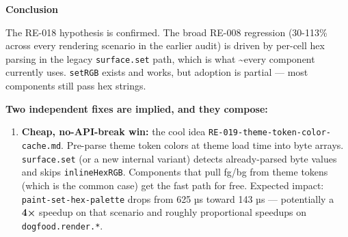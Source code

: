 \textbf{Conclusion}

The RE-018 hypothesis is confirmed. The broad RE-008 regression (30-113\% across every rendering scenario in the earlier audit) is driven by per-cell hex parsing in the legacy \texttt{s\allowbreak{}u\allowbreak{}r\allowbreak{}f\allowbreak{}a\allowbreak{}c\allowbreak{}e\allowbreak{}.\allowbreak{}s\allowbreak{}e\allowbreak{}t} path, which is what \textasciitilde every component currently uses. \texttt{s\allowbreak{}e\allowbreak{}t\allowbreak{}R\allowbreak{}G\allowbreak{}B} exists and works, but adoption is partial --- most components still pass hex strings.

\textbf{Two independent fixes are implied, and they compose:}

\begin{enumerate}
\def\labelenumi{\arabic{enumi}.}
\tightlist
\item
  \textbf{Cheap, no-API-break win:} the cool idea \texttt{R\allowbreak{}E\allowbreak{}-\allowbreak{}0\allowbreak{}1\allowbreak{}9\allowbreak{}-\allowbreak{}t\allowbreak{}h\allowbreak{}e\allowbreak{}m\allowbreak{}e\allowbreak{}-\allowbreak{}t\allowbreak{}o\allowbreak{}k\allowbreak{}e\allowbreak{}n\allowbreak{}-\allowbreak{}c\allowbreak{}o\allowbreak{}l\allowbreak{}o\allowbreak{}r\allowbreak{}-\allowbreak{}c\allowbreak{}a\allowbreak{}c\allowbreak{}h\allowbreak{}e\allowbreak{}.\allowbreak{}m\allowbreak{}d}. Pre-parse theme token colors at theme load time into byte arrays. \texttt{s\allowbreak{}u\allowbreak{}r\allowbreak{}f\allowbreak{}a\allowbreak{}c\allowbreak{}e\allowbreak{}.\allowbreak{}s\allowbreak{}e\allowbreak{}t} (or a new internal variant) detects already-parsed byte values and skips \texttt{i\allowbreak{}n\allowbreak{}l\allowbreak{}i\allowbreak{}n\allowbreak{}e\allowbreak{}H\allowbreak{}e\allowbreak{}x\allowbreak{}R\allowbreak{}G\allowbreak{}B}. Components that pull fg/bg from theme tokens (which is the common case) get the fast path for free. Expected impact: \texttt{p\allowbreak{}a\allowbreak{}i\allowbreak{}n\allowbreak{}t\allowbreak{}-\allowbreak{}s\allowbreak{}e\allowbreak{}t\allowbreak{}-\allowbreak{}h\allowbreak{}e\allowbreak{}x\allowbreak{}-\allowbreak{}p\allowbreak{}a\allowbreak{}l\allowbreak{}e\allowbreak{}t\allowbreak{}t\allowbreak{}e} drops from 625 µs toward 143 µs --- potentially a \textbf{4×} speedup on that scenario and roughly proportional speedups on \texttt{d\allowbreak{}o\allowbreak{}g\allowbreak{}f\allowbreak{}o\allowbreak{}o\allowbreak{}d\allowbreak{}.\allowbreak{}r\allowbreak{}e\allowbreak{}n\allowbreak{}d\allowbreak{}e\allowbreak{}r\allowbreak{}.\allowbreak{}*}.

\end{enumerate}
